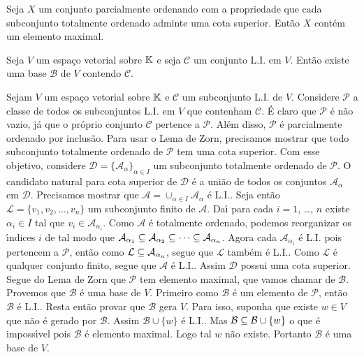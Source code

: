 \begin{lema}
	Seja $X$ um conjunto parcialmente ordenando com a propriedade que cada subconjunto totalmente ordenado adminte uma cota superior. Ent\~ao $X$ cont\'em um elemento maximal.
\end{lema}

\begin{teorema}
	Seja $V$ um espa\c{c}o vetorial sobre $\mathbb{K}$ e seja $\mathcal{C}$ um conjunto L.I. em $V$. Ent\~ao existe uma base $\mathcal{B}$ de $V$ contendo $\mathcal{C}$.	
\end{teorema}
\begin{prova}
	Sejam $V$ um espa\c{c}o vetorial sobre $\mathbb{K}$ e $\mathcal{C}$ um subconjunto L.I. de $V$. Considere $\mathcal{P}$ a classe de todos os subconjuntos L.I. em $V$ que contenham $\mathcal{C}$. \'E claro que $\mathcal{P}$ \'e n\~ao vazio, j\'a que o pr\'oprio conjunto $\mathcal{C}$ pertence a $\mathcal{P}$. Al\'em disso, $\mathcal{P}$ \'e parcialmente ordenado por inclus\~ao. Para usar o Lema de Zorn, precisamos mostrar que todo subconjunto totalmente ordenado de $\mathcal{P}$ tem uma cota superior. Com esse objetivo, considere $\mathcal{D} = \{\mathcal{A}_\alpha\}_{\alpha \in I}$ um subconjunto totalmente ordenado de $\mathcal{P}$. O candidato natural para cota superior de $\mathcal{D}$ \'e a uni\~ao de todos os conjuntos $\mathcal{A}_\alpha$ em $\mathcal{D}$. Precisamos mostrar que $\mathcal{A} = \cup_{\alpha \in I}\mathcal{A}_\alpha$ \'e L.I.. Seja ent\~ao $\mathcal{L} = \{v_1, v_2, \dots,v_n\}$ um subconjunto finito de $\mathcal{A}$. Da{\'\i} para cada $i = 1$, \dots, $n$ existe $\alpha_i \in I$ tal que $v_i \in \mathcal{A}_{\alpha_i}$. Como $\mathcal{A}$ \'e totalmente ordenado, podemos reorganizar os {\'\i}ndices $i$ de tal modo que $\mathcal{A}_{\alpha_1} \subseteq \mathcal{A}_{\alpha_2} \subseteq \cdots \subseteq \mathcal{A}_{\alpha_n}$. Agora cada $\mathcal{A}_{\alpha_i}$ \'e L.I. pois pertencem a $\mathcal{P}$, ent\~ao como $\mathcal{L} \subseteq \mathcal{A}_{\alpha_n}$, segue que $\mathcal{L}$ tamb\'em \'e L.I.. Como $\mathcal{L}$ \'e qualquer conjunto finito, segue que $\mathcal{A}$ \'e L.I.. Assim $\mathcal{D}$ possui uma cota superior. Segue do Lema de Zorn que $\mathcal{P}$ tem elemento maximal, que vamos chamar de $\mathcal{B}$. Provemos que $\mathcal{B}$ \'e uma base de $V$. Primeiro como $\mathcal{B}$ \'e um elemento de $\mathcal{P}$, ent\~ao $\mathcal{B}$ \'e L.I.. Resta ent\~ao provar que $\mathcal{B}$ gera $V$. Para isso, suponha que existe $w \in V$ que n\~ao \'e gerado por $\mathcal{B}$. Assim $\mathcal{B} \cup \{w\}$ \'e L.I.. Mas $\mathcal{B} \subseteq \mathcal{B} \cup \{w\}$ o que \'e imposs{\'\i}vel pois $\mathcal{B}$ \'e elemento maximal. Logo tal $w$ n\~ao existe. Portanto $\mathcal{B}$ \'e uma base de $V$.
\end{prova}
